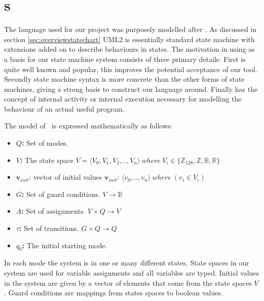 \section{\plcchart s}
\label{sec:statechartsem}

The language used for our project was purposely modelled after \cite{UML2}. As discussed in section \ref{sec:overviewstatechart} UML2 is essentially standard state machine with extensions added on to describe behaviours in states. The motivation in using \cite{UML2} as a basis for our state machine system consists of three primary details: First \cite{UML2} is quite well known and popular, this improves the potential acceptance of our tool. Secondly \cite{UML2} state machine syntax is more concrete than the other forms of state machines, giving a strong basis to construct our language around. Finally \cite{UML2} has the concept of internal activity or internal execution necessary for modelling the behaviour of an actual useful program.

The model of \plcchart $\:$ is expressed mathematically as follows:

\begin{definition}
	\plcchart
	
\begin{itemize}
	\item \textbf{$Q$:} Set of modes.
	\item \textbf{$V$:} The state space $V = \langle V_0,V_1,V_2,..,V_n \rangle \: where \: V_{i}\in \lbrace \mathbb{Z}_{128}, \mathbb{Z}, \mathbb{B}, \mathbb{R} \rbrace$
	\item $\mathbf{v}_{init}$: vector of initial values $\mathbf{v}_{init}$: $\langle v_0,..,v_n \rangle \: where \: (v_i \in V_i)$
	\item \textbf{$G$:} Set of guard conditions. $V \rightarrow \mathbb{B}$
	\item \textbf{$A$:} Set of assignments. $V \times Q \rightarrow V$
	\item \textbf{$\tau$:} Set of transitions. $G \times Q \rightarrow Q$
	\item \textbf{$q_0$:} The initial starting mode.
\end{itemize}
\end{definition}

In each mode the system is in one or many different states. State spaces in our system are used for variable assignments and all variables are typed. Initial values in the system are given by a vector of elements that come from the state spaces $V$.  Guard conditions are mappings from states spaces to boolean values.

